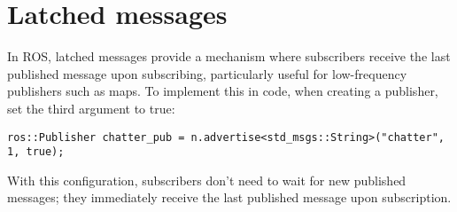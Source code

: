 \section{Latched messages}
In ROS, latched messages provide a mechanism where subscribers receive the last published message upon subscribing, particularly useful for low-frequency publishers such as maps.
To implement this in code, when creating a publisher, set the third argument to true:
\begin{verbatim}
ros::Publisher chatter_pub = n.advertise<std_msgs::String>("chatter", 1, true);
\end{verbatim}
With this configuration, subscribers don't need to wait for new published messages; they immediately receive the last published message upon subscription.